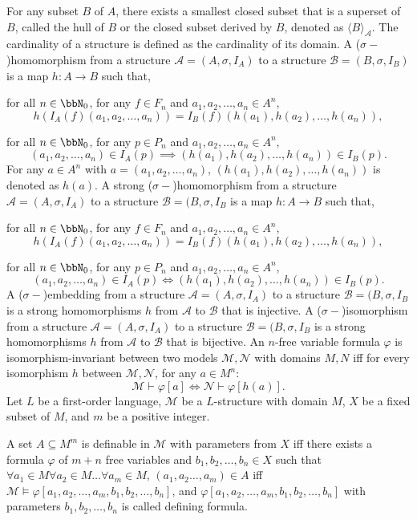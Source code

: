 \documentclass[a4paper,12pt]{article}
\begin{document}
For any subset $B$ of $A$, there exists a smallest closed subset that is a superset of $B$, called the hull of $B$ or the closed subset derived by $B$, denoted as $\langle B\rangle_{\mathcal{A}}$.
The cardinality of a structure is defined as the cardinality of its domain.
A ($\sigma-$)homomorphism from a structure $\mathcal{A}=(A,\sigma,I_A)$ to a structure $\mathcal{B}=(B,\sigma,I_B)$ is a map $h\colon A\to B$ such that,
\bit
\item for all $n\in\bbN_0$, for any $f\in F_n$ and $a_1,a_2,\ldots,a_n\in A^n$,
\[h(I_A(f)(a_1,a_2,\ldots,a_n))=I_B(f)(h(a_1),h(a_2),\ldots,h(a_n)),\]
\item for all $n\in\bbN_0$, for any $p\in P_n$ and $a_1,a_2,\ldots,a_n\in A^n$,
\[(a_1,a_2,\ldots,a_n)\in I_A(p)\implies(h(a_1),h(a_2),\ldots,h(a_n))\in I_B(p).\]
\eit
For any $a\in A^n$ with $a=(a_1,a_2,\ldots,a_n)$, $(h(a_1),h(a_2),\ldots,h(a_n))$ is denoted as $h(a)$.
A strong ($\sigma-$)homomorphism from a structure $\mathcal{A}=(A,\sigma,I_A)$ to a structure $\mathcal{B}=(B,\sigma,I_B$ is a map $h\colon A\to B$ such that,
\bit
\item for all $n\in\bbN_0$, for any $f\in F_n$ and $a_1,a_2,\ldots,a_n\in A^n$,
\[h(I_A(f)(a_1,a_2,\ldots,a_n))=I_B(f)(h(a_1),h(a_2),\ldots,h(a_n)),\]
\item for all $n\in\bbN_0$, for any $p\in P_n$ and $a_1,a_2,\ldots,a_n\in A^n$,
\[(a_1,a_2,\ldots,a_n)\in I_A(p)\iff(h(a_1),h(a_2),\ldots,h(a_n))\in I_B(p).\]
\eit
{}
A ($\sigma-$)embedding from a structure $\mathcal{A}=(A,\sigma,I_A)$ to a structure $\mathcal{B}=(B,\sigma,I_B$ is a strong homomorphisms $h$ from $\mathcal{A}$ to $\mathcal{B}$ that is injective.
A ($\sigma-$)isomorphism from a structure $\mathcal{A}=(A,\sigma,I_A)$ to a structure $\mathcal{B}=(B,\sigma,I_B$ is a strong homomorphisms $h$ from $\mathcal{A}$ to $\mathcal{B}$ that is bijective.
An $n$-free variable formula $\varphi$ is isomorphism-invariant between two models $\mathcal{M},\mathcal{N}$ with domains $M,N$ iff for every isomorphism $h$ between $\mathcal{M},\mathcal{N}$, for any $a\in M^n$:
\[\mathcal{M}\vdash\varphi[a]\iff\mathcal{N}\vdash\varphi[h(a)].\]
Let $L$ be a first-order language, $\mathcal{M}$ be a $L$-structure with domain $M$, $X$ be a fixed subset of $M$, and $m$ be a positive integer.
\bit
\item A set $A\subseteq M^m$ is definable in $\mathcal{M}$ with parameters from $X$ iff there exists a formula $\varphi$ of $m+n$ free variables and $b_1,b_2,\ldots,b_n\in X$ such that $\forall a_1\in M\forall a_2\in M\ldots\forall a_m\in M$, $(a_1,a_2\ldots,a_m)\in A$ iff $\mathcal{M}\vDash\varphi[a_1,a_2,\ldots,a_m,b_1,b_2,\ldots,b_n]$, and $\varphi[a_1,a_2,\ldots,a_m,b_1,b_2,\ldots,b_n]$ with parameters $b_1,b_2,\ldots,b_n$ is called defining formula.
\end{document}
